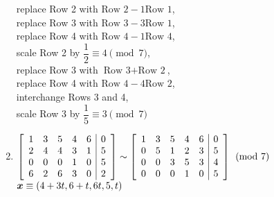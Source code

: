 \begin{enumerate}[!HW!, start=1]
\begin{multicols}{2}
replace Row 2 with $\text{Row 2} - 1\text{Row 1}$,\\
replace Row 3 with $\text{Row 3} - 3\text{Row 1}$,\\ replace Row 4 with $\text{Row 4} - 1\text{Row 4}$,\\ scale Row 2 by $\dfrac{1}{2} \equiv 4\pmod 7$,\\ replace Row 3 with $\text{Row 3} + \text{Row 2}$,\\ replace Row 4 with $\text{Row 4} - 4\text{Row 2}$,\\
interchange Rows 3 and 4,\\ scale Row 3 by $\dfrac{1}{5} \equiv 3\pmod 7$%
\end{multicols}
\item \mbox{$\mtx{rrrrr|r}{1&3&5&4&6&0\\2&4&4&3&1&5\\0&0&0&1&0&5\\6&2&6&3&0&2}\sim\mtx{rrrrr|r}{1&3&5&4&6&0\\0&5&1&2&3&5\\0&0&3&5&3&4\\0&0&0&1&0&5} \pmod 7$}\\
$\bb x \equiv (4+3t, 6+t, 6t, 5, t)$


\end{enumerate}
